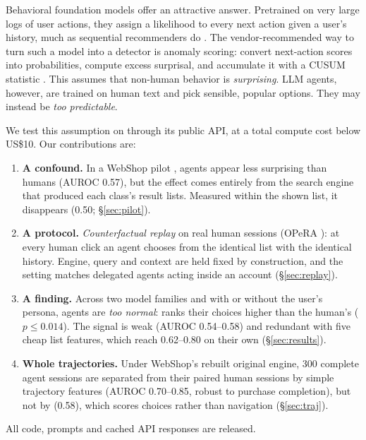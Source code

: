 Behavioral foundation models offer an attractive answer. Pretrained on very large logs of user actions, they assign a likelihood to every next action given a user's history, much as sequential recommenders do \cite{kang2018sasrec}. The vendor-recommended way to turn such a model into a detector is anomaly scoring: convert next-action scores into probabilities, compute excess surprisal, and accumulate it with a CUSUM statistic \cite{page1954cusum,unbox2026anomaly}. This assumes that non-human behavior is \emph{surprising}. LLM agents, however, are trained on human text and pick sensible, popular options. They may instead be \emph{too predictable}.

We test this assumption on \bgpt{} \cite{unbox2026docs} through its public API, at a total compute cost below US\$10. Our contributions are:
\begin{enumerate}
  \item \textbf{A confound.} In a WebShop pilot \cite{yao2022webshop}, agents appear less surprising than humans (AUROC 0.57), but the effect comes entirely from the search engine that produced each class's result lists. Measured within the shown list, it disappears (0.50; \S\ref{sec:pilot}).
  \item \textbf{A protocol.} \emph{Counterfactual replay} on real human sessions (OPeRA \cite{wang2025opera}): at every human click an agent chooses from the identical list with the identical history. Engine, query and context are held fixed by construction, and the setting matches delegated agents acting inside an account (\S\ref{sec:replay}).
  \item \textbf{A finding.} Across two model families and with or without the user's persona, agents are \emph{too normal}: \bgpt{} ranks their choices higher than the human's ($p\le0.014$). The signal is weak (AUROC 0.54--0.58) and redundant with five cheap list features, which reach 0.62--0.80 on their own (\S\ref{sec:results}).
  \item \textbf{Whole trajectories.} Under WebShop's rebuilt original engine, 300 complete agent sessions are separated from their paired human sessions by simple trajectory features (AUROC 0.70--0.85, robust to purchase completion), but not by \bgpt{} (0.58), which scores choices rather than navigation (\S\ref{sec:traj}).
\end{enumerate}
All code, prompts and cached API responses are released.

